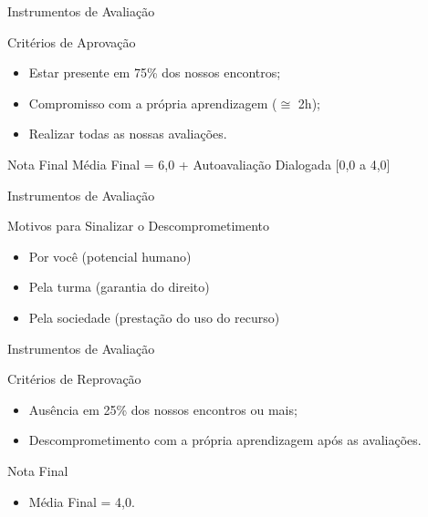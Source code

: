 \documentclass[xcolor=dvipsnames,table]{beamer}
\begin{document}
\begin{frame}{Instrumentos de Avaliação}
    \begin{block}{Critérios de Aprovação}
    	\begin{itemize}
    		\item Estar presente em 75\% dos nossos encontros;
    		\item Compromisso com a própria aprendizagem ($\cong$ 2h);
    		\item Realizar todas as nossas avaliações.
    	\end{itemize}
    \end{block} \pause
    \begin{exampleblock}{Nota Final}
    	Média Final = 6,0 + Autoavaliação Dialogada [0,0 a 4,0]
    \end{exampleblock}
\end{frame}

\begin{frame}{Instrumentos de Avaliação}
    \begin{block}{Motivos para Sinalizar o Descomprometimento}
        \begin{itemize}
            \item Por você (potencial humano)
            \item Pela turma (garantia do direito)
            \item Pela sociedade (prestação do uso do recurso)
        \end{itemize}
    \end{block}
\end{frame}

\begin{frame}{Instrumentos de Avaliação}
    \begin{block}{Critérios de Reprovação}
        \begin{itemize}
            \item Ausência em 25\% dos nossos encontros ou mais;
            \item Descomprometimento com a própria aprendizagem após as avaliações.
        \end{itemize}
    \end{block} \pause
    \begin{alertblock}{Nota Final}
        \begin{itemize}
            \item Média Final = 4,0.
        \end{itemize}
        
    \end{alertblock}
\end{frame}
\end{document}
